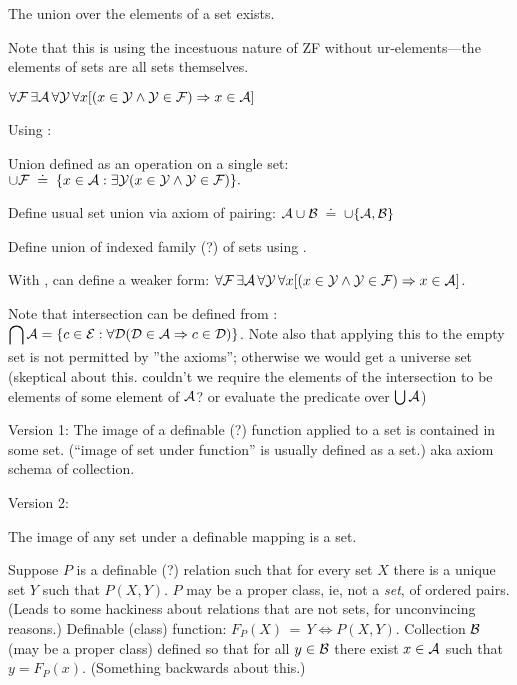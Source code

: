 The union over the elements of a set 
exists\cite{wiki:Axiom_of_union}.

Note that this is using the incestuous nature of 
\textsf{ZF} without ur-elements---the elements of sets
are all sets themselves. 
 
$\forall {\ensuremath{\mathcal{F}}}\,
\exists \mathcal{A}\,
\forall \mathcal{Y}\,\forall x
[(x\in \mathcal{Y} \land \mathcal{Y}\in \mathcal{F})
\Rightarrow x\in \mathcal{A}]$

Using :

Union defined as an operation on a single set:\hfill\break
${\displaystyle 
\cup {\ensuremath{\mathcal{F}}} \; \doteq \;
\{x\in \mathcal{A}:\exists \mathcal{Y} 
(x \in \mathcal{Y} \land \mathcal{Y} \in \mathcal{F})\}.}$

Define usual set union via axiom of pairing:
$\mathcal{A} \cup \mathcal{B} \; \doteq \; \cup \{ \mathcal{A}, \mathcal{B}\}$

Define union of indexed family (?) of sets
using .

With ,
can define a weaker form:
$\forall {\ensuremath{\mathcal{F}}}\,\exists \mathcal{A}\,\forall \mathcal{Y}\,
\forall x
[(x\in \mathcal{Y} 
\land 
\mathcal{Y}\in {\ensuremath{\mathcal{F}}})
\Rightarrow 
x\in \mathcal{A}]$.

Note that intersection can be defined from 
:\hfill\linebreak
${\displaystyle 
\bigcap \mathcal{A}=\{c\in \mathcal{E}:
\forall \mathcal{D} (\mathcal{D} \in \mathcal{A} \Rightarrow c\in \mathcal{D})\}}$.
Note also that applying this to the empty set
is not permitted by ''the axioms'';
otherwise we would get a universe set 
(skeptical about this.
couldn't we require the elements of the intersection
to be elements of some element of $\mathcal{A}$?
or evaluate the predicate over $\bigcup \mathcal{A}$)

\label{sec:Axiom-schema-of-replacement}

Version 1: 
The image of a definable (?) function applied to a set
is contained in some set.\cite{wiki:Axiom_schema_of_replacement}
(``image of set under function'' is usually defined as a set.)
aka axiom schema of collection.

Version 2: 

The image of any set under a definable mapping is a set.

Suppose $P$ is a definable (?) relation such that for every
set $X$ there is a unique set $Y$ such that $P(X,Y)$.
$P$ may be a proper class\cite{wiki:Class_set_theory}, 
ie, not a \textit{set}, of ordered pairs. 
(Leads to some hackiness about relations that are not sets,
for unconvincing reasons\cite{wiki:Binary_relation}.)
Definable (class) function: $F_P(X)\,=\,Y \iff P(X,Y)$.
Collection $\mathcal{B}$ (may be a proper class)
defined so that for all $y\in\mathcal{B}$ there exist $x \in \mathcal{A}$
such that $y=F_P(x)$.
(Something backwards about this.)

